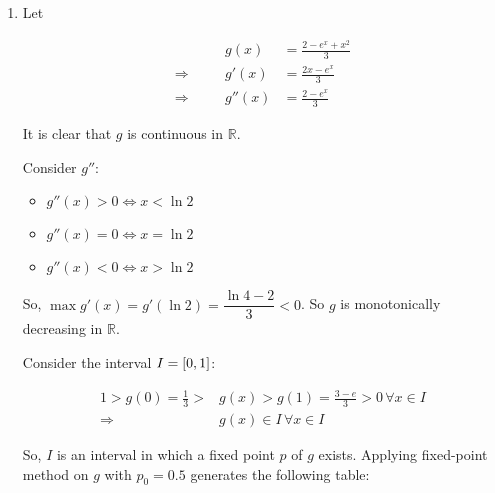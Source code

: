 \documentclass[../../../../Assignments]{subfiles}
\begin{document}
\begin{solution}
    \begin{enumerate}[label = \alph*)]
        \item Let

            \[\begin{aligned}
                &\quad&         g(x) &= \frac{2 - e^x + x^2}{3} \\
                \Rightarrow&&  g'(x) &= \frac{2x - e^x}{3} \\
                \Rightarrow&& g''(x) &= \frac{2 - e^x}{3}
            \end{aligned}\]

            It is clear that \(g\) is continuous in \(\mathbb{R}\).

            Consider \(g''\):

            \begin{itemize}
                \item \(g''(x) > 0 \iff x < \ln{2}\)
                \item \(g''(x) = 0 \iff x = \ln{2}\)
                \item \(g''(x) < 0 \iff x > \ln{2}\)
            \end{itemize}

            So, \(\max g'(x) = g'(\ln{2}) = \dfrac{\ln{4} - 2}{3} < 0\). So \(g\)
            is monotonically decreasing in \(\mathbb{R}\).

            Consider the interval \(I = \interval{0}{1}\):

            \[\]
            \[\begin{aligned}
                1 > g(0) = \frac{1}{3} > &g(x) > g(1) = \frac{3 - e}{3} > 0 \, \forall x \in I \\
                             \Rightarrow &g(x) \in I \, \forall x \in I
            \end{aligned}\]

            So, \(I\) is an interval in which a fixed point \(p\) of \(g\)
            exists. Applying fixed-point method on \(g\) with \(p_0 =
            \num{0.5}\) generates the following table:


\end{enumerate}
\end{solution}
\end{document}

